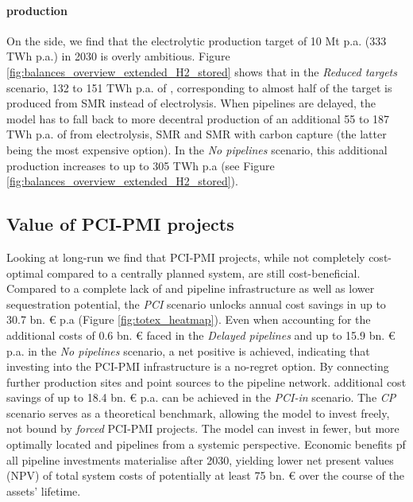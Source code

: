 \documentclass[preprint,12pt,sort&compress]{elsarticle}
\begin{document}
\paragraph{ production} 
On the  side, we find that the electrolytic  production target of 10 Mt p.a. (333 TWh p.a.) in 2030 is overly ambitious. Figure \ref{fig:balances_overview_extended_H2_stored} shows that in the \textit{Reduced targets} scenario, 132 to 151 TWh p.a. of , corresponding to almost half of the target is produced from SMR instead of electrolysis. When pipelines are delayed, the model has to fall back to more decentral  production of an additional 55 to 187 TWh p.a. of  from electrolysis, SMR and SMR with carbon capture (the latter being the most expensive option). In the \textit{No pipelines} scenario, this additional  production increases to up to 305 TWh p.a (see Figure \ref{fig:balances_overview_extended_H2_stored}).

\subsection{Value of PCI-PMI projects}
\label{sec:value_of_pcipmi_projects}
Looking at long-run we find that PCI-PMI projects, while not completely cost-optimal compared to a centrally planned system, are still cost-beneficial. Compared to a complete lack of  and  pipeline infrastructure as well as lower  sequestration potential, the \textit{PCI} scenario unlocks annual cost savings in up to 30.7 bn. \euro{} p.a (Figure \ref{fig:totex_heatmap}). Even when accounting for the additional costs of 0.6 bn. \euro{} faced in the \textit{Delayed pipelines} and up to 15.9 bn. \euro{} p.a. in the \textit{No pipelines} scenario, a net positive is achieved, indicating that investing into the PCI-PMI infrastructure is a no-regret option. By connecting further  production sites and  point sources to the pipeline network. additional cost savings of up to 18.4 bn. \euro{} p.a. can be achieved in the \textit{PCI-in} scenario. The \textit{CP} scenario serves as a theoretical benchmark, allowing the model to invest freely, not bound by \textit{forced} PCI-PMI projects. The model can invest in fewer, but more optimally located  and  pipelines from a systemic perspective. Economic benefits pf all pipeline investments materialise after 2030, yielding lower net present values (NPV) of total system costs of potentially at least 75 bn. \euro{} over the course of the assets' lifetime. 
\end{document}
